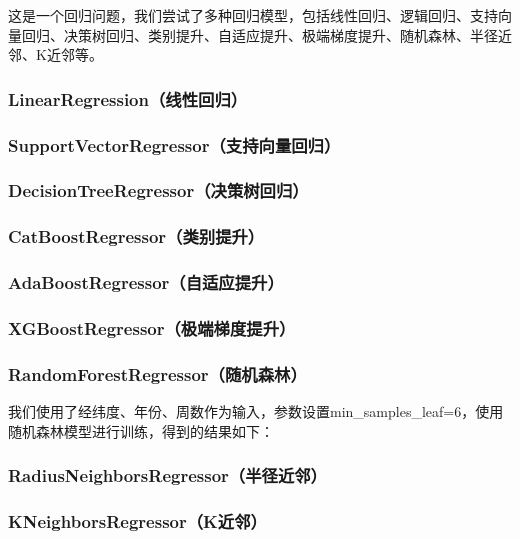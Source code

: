 \documentclass[fontset=windows]{article}
\begin{document}
这是一个回归问题，我们尝试了多种回归模型，包括线性回归、逻辑回归、支持向量回归、决策树回归、类别提升、自适应提升、极端梯度提升、随机森林、半径近邻、K近邻等。

\subsubsection{LinearRegression（线性回归）}

\subsubsection{SupportVectorRegressor（支持向量回归）}

\subsubsection{DecisionTreeRegressor（决策树回归）}

\subsubsection{CatBoostRegressor（类别提升）}

\subsubsection{AdaBoostRegressor（自适应提升）}

\subsubsection{XGBoostRegressor（极端梯度提升）}

\subsubsection{RandomForestRegressor（随机森林）}

我们使用了经纬度、年份、周数作为输入，参数设置min\_samples\_leaf=6，使用随机森林模型进行训练，得到的结果如下：

\subsubsection{RadiusNeighborsRegressor（半径近邻）}

\subsubsection{KNeighborsRegressor（K近邻）}
\end{document}
